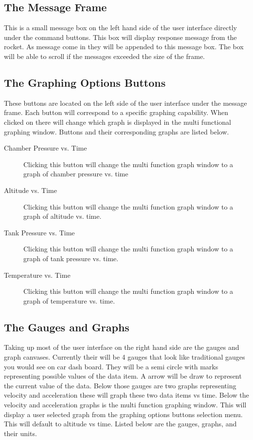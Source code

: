 \documentclass[10pt,draftclsnofoot,onecolumn,retainorgcmds]{IEEEtran}
\begin{document}
\subsection{The Message Frame}
This is a small message box on the left hand side of the user interface directly under the command buttons. This box will display response message from the rocket. As message come in they will be appended to this message box. The box will be able to scroll if the messages exceeded the size of the frame.\par

\subsection{The Graphing Options Buttons}
These buttons are located on the left side of the user interface under the message frame. Each button will correspond to a specific graphing capability. When clicked on there will change which graph is displayed in the multi functional graphing window. Buttons and their corresponding graphs are listed below. \par

\begin{description}
	\item[Chamber Pressure vs. Time] Clicking this button will change the multi function graph window to a graph of chamber pressure vs. time
	\item[Altitude vs. Time] Clicking this button will change the multi function graph window to a graph of altitude vs. time.
	\item[Tank Pressure vs. Time] Clicking this button will change the multi function graph window to a graph of tank pressure vs. time.
	\item[Temperature vs. Time] Clicking this button will change the multi function graph window to a graph of temperature vs. time.
	
\end{description}

\subsection{The Gauges and Graphs}
Taking up most of the user interface on the right hand side are the gauges and graph canvases. Currently their will be 4 gauges that look like traditional gauges you would see on car dash board. They will be a semi circle with marks representing possible values of the data item. A arrow will be draw to represent the current value of the data. Below those gauges are two graphs representing velocity and acceleration these will graph these two data items vs time. Below the velocity and acceleration graphs is the multi function graphing window. This will display a user selected graph from the graphing options buttons selection menu. This will default to altitude vs time. Listed below are the gauges, graphs, and their units.
\end{document}

